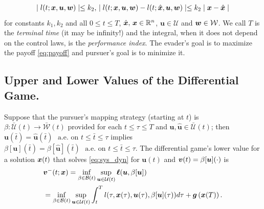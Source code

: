 %
\begin{subequations}
	\begin{align}
		\mid l(t; \bm{x}, \bm{u}, \bm{w}) \mid \le k_2, \,
		\mid l(t; \bm{x}, \bm{u}, \bm{w})  -  l(t; \hat{\bm{x}}, \bm{u}, \bm{w}) \mid  \le k_2 \mid \bm{x} - \hat{\bm{x}} \mid
	\end{align}
\end{subequations}
%
for constants $k_1, k_2$ and all 
 $0 \le t \le T$, $\hat{\bm{x}}, \, \bm{x} \in \mathbb{R}^n$, $\bm{u}\in \mathcal{U}$ and $\bm{w} \in \mathcal{W}$. 
We call $T$ is the \textit{terminal time} (it may be infinity!) and the integral, when it does not depend on the control laws, is the \textit{performance index}. The evader's goal is to maximize the payoff \eqref{eq:payoff} and pursuer's goal is to minimize it. %


\subsection{Upper and Lower Values of the Differential Game.}

\noindent Suppose that the pursuer's mapping strategy (starting at $t$) is $\beta: \mathcal{\bar{U}}({t}) \rightarrow \mathcal{\bar{W}}({t})$ provided for each $t \le \tau \le T$ and $\bm{u}, \hat{\bm{u}} \in \mathcal{\bar{U}}({t})$; then $\bm{u}(\bar{t}) = \hat{\bm{u}}(\bar{t}) \,\, \text{ a.e. on } t \le \bar{t}  \le \tau$ implies $\beta[\bm{u}](\bar{t}) = \beta[\hat{\bm{u}}](\bar{t}) \,\, \text{ a.e. on } t \le \bar{t}  \le \tau$.
%
The differential game's lower value for a solution $\bm{x}(t)$ that solves \eqref{eq:sys_dyn} for $\bm{u}(t)$ and $\bm{v}(t) = \beta[\bm{u}](\cdot)$ is 
%
\begin{align}
	&\lowervalue(t; \state) = \inf_{\beta \in \mathcal{B}(t)} \sup_{\bm{u} \in \mathcal{U}(t)} \bm{\ell}(\bm{u}, \beta[\bm{u}]) \nonumber \\
	&=  \inf_{\beta \in \mathcal{B}(t)} \sup_{\bm{u} \in \mathcal{U}(t)} %
	\int_{t}^{T} l(\tau, \bm{x}(\tau), \bm{u}(\tau), \beta[\bm{u}](\tau)) d\tau + \bm{g}\left(\bm{x}(T)\right). %
\end{align}

